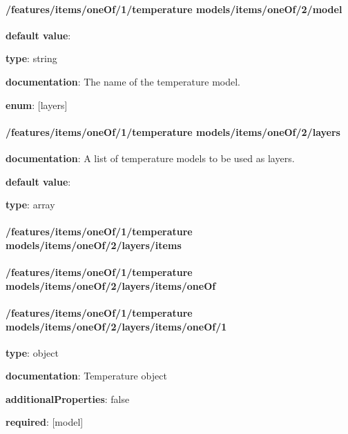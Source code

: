 \paragraph{/features/items/oneOf/1/temperature models/items/oneOf/2/model} \begin{itemized}
\item {\bf default value}: 
\item {\bf type}: string
\item {\bf documentation}: The name of the temperature model.
\item {\bf enum}: [layers]\end{itemized}\paragraph{/features/items/oneOf/1/temperature models/items/oneOf/2/layers} \begin{itemized}
\item {\bf documentation}: A list of temperature models to be used as layers.
\item {\bf default value}: 
\item {\bf type}: array
\paragraph{/features/items/oneOf/1/temperature models/items/oneOf/2/layers/items} \begin{itemized}
\end{itemized}\end{itemized}\paragraph{/features/items/oneOf/1/temperature models/items/oneOf/2/layers/items/oneOf} \begin{itemized}
\end{itemized}\paragraph{/features/items/oneOf/1/temperature models/items/oneOf/2/layers/items/oneOf/1} \begin{itemized}
\item {\bf type}: object
\item {\bf documentation}: Temperature object
\item {\bf additionalProperties}: false
\item {\bf required}: [model]\end{itemized}
